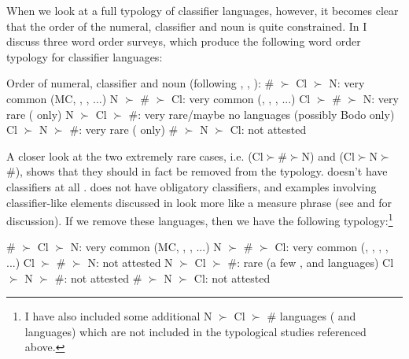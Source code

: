 \documentclass[output=paper
,modfonts
,nonflat]{langsci/langscibook}
\begin{document}
When we look at a full typology of classifier languages, however, it becomes clear that the order of the numeral, classifier and noun is quite constrained. In \citet{Hall2015} I discuss three word order surveys, which produce the following word order typology for classifier languages:

\ea \label{ex:hall:53}
Order of numeral, classifier and noun (following \citealt{Jones1970}, \citealt{Greenberg1972}, \citealt{Aikhenvald2000}):
\ea \# $\succ$ Cl $\succ$ N: very common (MC, , , ...)
\ex N $\succ$ \# $\succ$ Cl: very common (, , , ...)
\ex Cl $\succ$ \# $\succ$ N: very rare ( only)
\ex N $\succ$ Cl $\succ$ \#: very rare/maybe no languages (possibly Bodo only)
\ex Cl $\succ$ N $\succ$ \#: very rare ( only) \largerpage
\ex \# $\succ$ N $\succ$ Cl: not attested
\z
\z

A closer look at the two extremely rare cases, i.e.  (Cl$\succ$\#$\succ$N) and  (Cl$\succ$N$\succ$\#), shows that they should in fact be removed from the typology.  doesn't have classifiers at all \citep{Essien1990}.  does not have obligatory classifiers, and examples involving classifier-like elements discussed in \citet{Greenberg1972} look more like a measure phrase (see \citealt{Watters1981} and \citealt{Hall2015} for discussion). If we remove these languages, then we have the following typology:\footnote{I have also included some additional N $\succ$ Cl $\succ$ \# languages ( and  languages) which are not included in the typological studies referenced above.}

\ea \label{ex:hall:54}
\ea \# $\succ$ Cl $\succ$ N: very common (MC, , , ...)
\ex N $\succ$ \# $\succ$ Cl: very common (, , , , ...)
\ex Cl $\succ$ \# $\succ$ N: not attested
\ex N $\succ$ Cl $\succ$ \#: rare (a few ,  and  languages)
\ex Cl $\succ$ N $\succ$ \#: not attested
\ex \# $\succ$ N $\succ$ Cl: not attested
\z
\z
\end{document}
